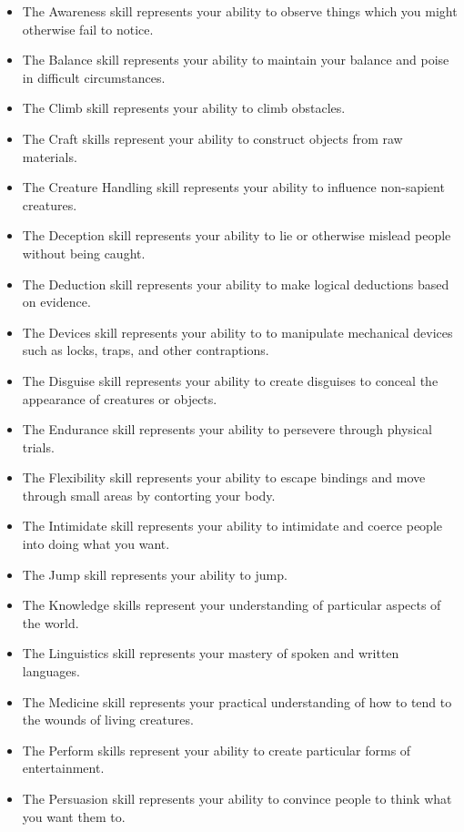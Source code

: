     \begin{itemize}
        \item The Awareness skill represents your ability to observe things which you might otherwise fail to notice.
        \item The Balance skill represents your ability to maintain your balance and poise in difficult circumstances.
        \item The Climb skill represents your ability to climb obstacles.
        \item The Craft skills represent your ability to construct objects from raw materials.
        \item The Creature Handling skill represents your ability to influence non-sapient creatures.
        \item The Deception skill represents your ability to lie or otherwise mislead people without being caught.
        \item The Deduction skill represents your ability to make logical deductions based on evidence.
        \item The Devices skill represents your ability to to manipulate mechanical devices such as locks, traps, and other contraptions.
        \item The Disguise skill represents your ability to create disguises to conceal the appearance of creatures or objects.
        \item The Endurance skill represents your ability to persevere through physical trials.
        \item The Flexibility skill represents your ability to escape bindings and move through small areas by contorting your body.
        \item The Intimidate skill represents your ability to intimidate and coerce people into doing what you want.
        \item The Jump skill represents your ability to jump.
        \item The Knowledge skills represent your understanding of particular aspects of the world.
        \item The Linguistics skill represents your mastery of spoken and written languages.
        \item The Medicine skill represents your practical understanding of how to tend to the wounds of living creatures.
        \item The Perform skills represent your ability to create particular forms of entertainment.
        \item The Persuasion skill represents your ability to convince people to think what you want them to.

\end{itemize}
